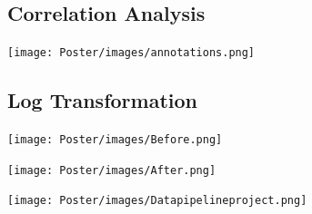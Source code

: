 \documentclass{a0poster}
\begin{document}
\begin{multicols}{3}


\begin{minipage}[t]{.90\linewidth}

\begin{center}
\noindent
\vspace{-.55cm}
 \section*{Correlation Analysis}
 \end{center}
 
\begin{flushright}
  \texttt{[image: Poster/images/annotations.png]}
\end{flushright}

\begin{center}
\noindent
\vspace{-.55cm}
\section*{Log Transformation}
\end{center}

\begin{center}
\begin{minipage}{.48\linewidth}
  \texttt{[image: Poster/images/Before.png]}
\end{minipage}
\begin{minipage}{.48\linewidth}
  \texttt{[image: Poster/images/After.png]}
\end{minipage}  
\end{center}

\end{minipage}

\noindent
\begin{minipage}[t]{.96\linewidth}
    \vspace{-.5cm}
    \begin{flushright}
      \texttt{[image: Poster/images/Datapipelineproject.png]}
    \end{flushright}
  

\end{minipage}
\end{multicols}
\end{document}
